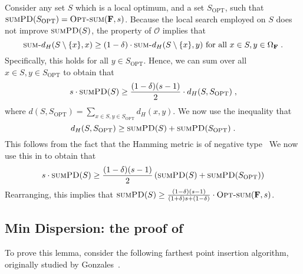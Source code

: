 \documentclass[11pt, letterpaper]{article}
\theoremstyle{definition}
\newcommand{\f}{\mathbf{F}}
\newcommand{\Om}{\Omega_{\f}}
\newcommand{\SPD}{\textsc{sumPD}}
\newcommand{\sumd}{\textsc{sum-}d_H}
\newcommand{\opts}{\textsc{Opt-sum}}
\newcommand{\Sopt}{S_{\text{OPT}}}
\begin{document}
 \medskip \noindent
 Consider any set $S$ which is a local optimum, and a set $\Sopt$, such that $\SPD(\Sopt)=\opts(\f,s)$. Because the local search employed on $S$ does not improve $\SPD(S)$, the property of $\mathcal{O}$ implies that
\[ \sumd(S \setminus \{x\},x) \geq (1 - \delta) \cdot \sumd(S \setminus \{x\},y) \text{ for all } x \in S, y \in \Om \; .\]
Specifically, this holds for all $y \in \Sopt$. Hence, we can sum over all $x \in S, y \in \Sopt$ to obtain that
\begin{equation} \label{eqn:swapping:termination}
     s \cdot \SPD(S) \geq\frac{(1-\delta)(s-1)}{2}  \cdot  d_H(S, \Sopt) \;,
\end{equation}
where $d(S, \Sopt)= \sum_{x \in S, y \in \Sopt}d_H(x,y)$. We now use the inequality that
\begin{equation}
    d_H(S, \Sopt) \geq \SPD(S) +  \SPD(\Sopt) \;.
\end{equation}
This follows from the fact that the Hamming metric is of negative type~\cite[Lemma 1]{cevallos2019improved} We now use this in  to obtain that
\begin{equation*}
    s \cdot \SPD(S) \geq \frac{(1-\delta)(s-1)}{2} \left(\SPD(S) +\SPD(\Sopt)\right)
\end{equation*}
Rearranging, this implies that $\SPD(S) \geq \frac{(1-\delta)(s-1)}{(1+\delta)s+(1-\delta)}\cdot \opts(\f,s)$. 
\subsection{Min Dispersion: the proof of }

\mindispersion*
To prove this lemma, consider the following farthest point insertion algorithm, originally studied by Gonzales~\cite{gonzalez1985clustering}. 
\end{document}
